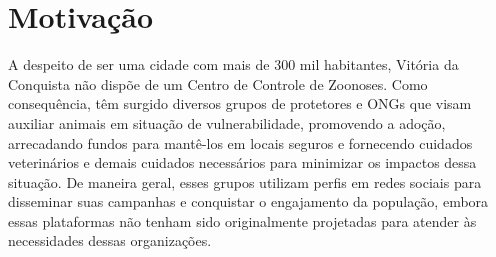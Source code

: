 






\section{Motivação}
\label{sec:Motivacao}
A despeito de ser uma cidade com mais de 300 mil habitantes, Vitória da Conquista não dispõe de um Centro de Controle de Zoonoses. Como consequência, têm surgido diversos grupos de protetores e ONGs que visam auxiliar animais em situação de vulnerabilidade, promovendo a adoção, arrecadando fundos para mantê-los em locais seguros e fornecendo cuidados veterinários e demais cuidados necessários para minimizar os impactos dessa situação. De maneira geral, esses grupos utilizam perfis em redes sociais para disseminar suas campanhas e conquistar o engajamento da população, embora essas plataformas não tenham sido originalmente projetadas para atender às necessidades dessas organizações.

